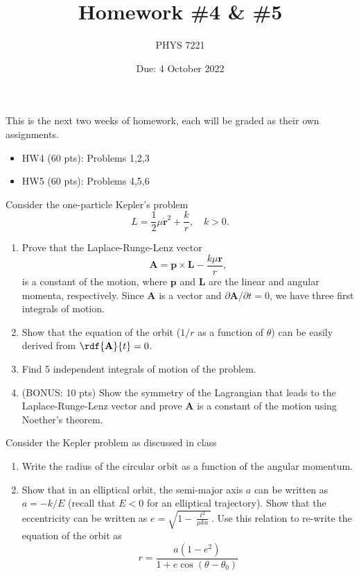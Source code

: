 \documentclass{jhwhw}
\author{PHYS 7221}
\title{Homework \#4 \& \#5}
\date{Due: 4 October 2022}
\begin{document}
\noindent This is the next two weeks of homework, each will be graded as their own assignments.
\begin{itemize}
  \item HW4 (60 pts): Problems 1,2,3
  \item HW5 (60 pts): Problems 4,5,6
\end{itemize}


Consider the one-particle Kepler's problem
\begin{equation}
  \label{eq:1}
  L = \frac12 \mu \dot {\mathbf r}^{2} + \frac{k}r, \quad k>0.
\end{equation}
\begin{enumerate}
  \item Prove that the Laplace-Runge-Lenz vector
        \begin{equation}
          \label{eq:2}
          \mathbf A = \mathbf p \times \mathbf L - \frac{k \mu \mathbf r}r,
        \end{equation}
        is a constant of the motion, where $\mathbf p$ and $\mathbf L$ are the linear and angular momenta, respectively.
        Since $\mathbf A$ is a vector and $\partial \mathbf A/ \partial t = 0$, we have three first integrals of motion.
  \item Show that the equation of the orbit ($1/r$ as a function of $\theta$) can be easily derived from $\rdf{\mathbf A}{t} = 0$.
  \item Find 5 independent integrals of motion of the problem.
  \item (BONUS: 10 pts) Show the symmetry of the Lagrangian that leads to the Laplace-Runge-Lenz vector and prove $\mathbf A$ is a constant of the motion using Noether's theorem.
\end{enumerate}

Consider the Kepler problem as discussed in class
\begin{enumerate}
  \item Write the radius of the circular orbit as a function of the angular momentum.
  \item Show that in an elliptical orbit, the semi-major axis $a$ can be written as $a = - k / E$ (recall that $E<0$ for an elliptical trajectory).
        Show that the eccentricity can be written as $e = \sqrt{1 - \frac{\ell^{2}}{\mu k a}}$.
        Use this relation to re-write the equation of the orbit as
        \begin{equation}
          \label{eq:3}
          r = \frac{a(1 - e^{2})}{1 + e \cos(\theta - \theta_{0})}
        \end{equation}
\end{enumerate}
\end{document}

